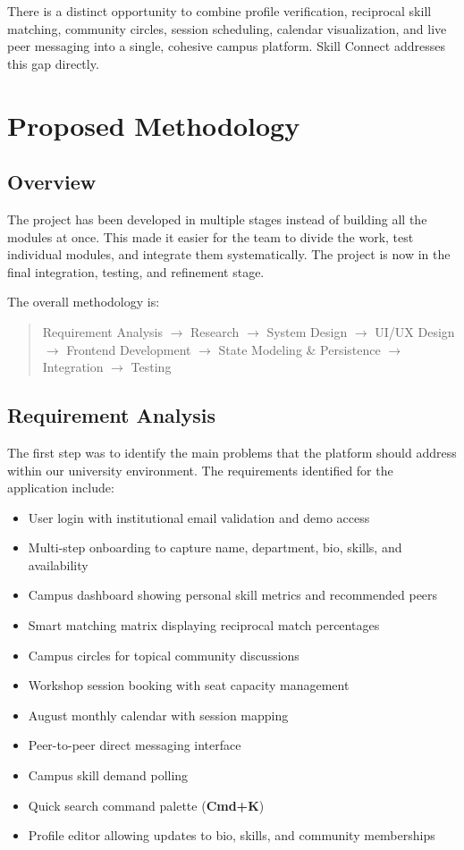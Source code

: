 \documentclass[12pt,a4paper]{report}
\begin{document}
There is a distinct opportunity to combine profile verification, reciprocal skill matching, community circles, session scheduling, calendar visualization, and live peer messaging into a single, cohesive campus platform. Skill Connect addresses this gap directly.

\newpage
\chapter{Proposed Methodology}

\section{Overview}
The project has been developed in multiple stages instead of building all the modules at once. This made it easier for the team to divide the work, test individual modules, and integrate them systematically. The project is now in the final integration, testing, and refinement stage.

The overall methodology is:
\begin{quote}
\centering
Requirement Analysis $\longrightarrow$ Research $\longrightarrow$ System Design $\longrightarrow$ UI/UX Design $\longrightarrow$ Frontend Development $\longrightarrow$ State Modeling \& Persistence $\longrightarrow$ Integration $\longrightarrow$ Testing
\end{quote}

\section{Requirement Analysis}
The first step was to identify the main problems that the platform should address within our university environment. The requirements identified for the application include:
\begin{itemize}
    \item User login with institutional email validation and demo access
    \item Multi-step onboarding to capture name, department, bio, skills, and availability
    \item Campus dashboard showing personal skill metrics and recommended peers
    \item Smart matching matrix displaying reciprocal match percentages
    \item Campus circles for topical community discussions
    \item Workshop session booking with seat capacity management
    \item August monthly calendar with session mapping
    \item Peer-to-peer direct messaging interface
    \item Campus skill demand polling
    \item Quick search command palette (\textbf{Cmd+K})
    \item Profile editor allowing updates to bio, skills, and community memberships
\end{itemize}
\end{document}
